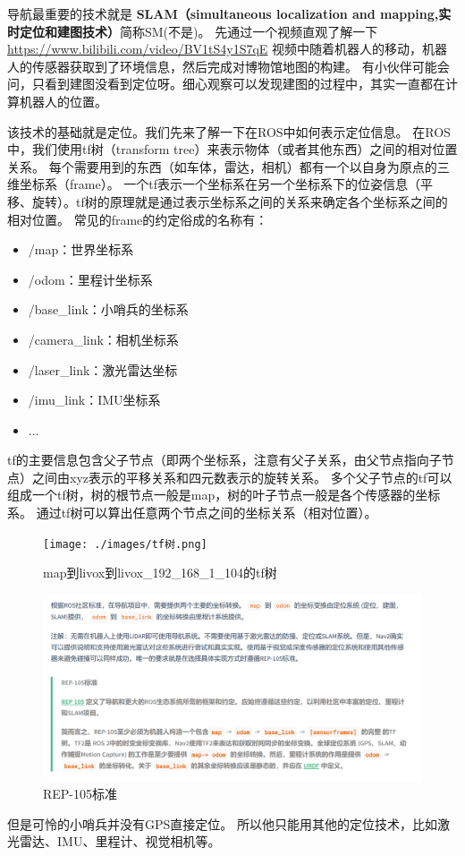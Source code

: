 导航最重要的技术就是
\textbf{SLAM（simultaneous localization and mapping,实时定位和建图技术）}简称SM(不是)。
先通过一个视频直观了解一下\url{https://www.bilibili.com/video/BV1tS4y1S7qE}
视频中随着机器人的移动，机器人的传感器获取到了环境信息，然后完成对博物馆地图的构建。
有小伙伴可能会问，只看到建图没看到定位呀。细心观察可以发现建图的过程中，其实一直都在计算机器人的位置。

该技术的基础就是定位。我们先来了解一下在ROS中如何表示定位信息。
在ROS中，我们使用tf树（transform tree）来表示物体（或者其他东西）之间的相对位置关系。
每个需要用到的东西（如车体，雷达，相机）都有一个以自身为原点的三维坐标系（frame）。
一个tf表示一个坐标系在另一个坐标系下的位姿信息（平移、旋转）。tf树的原理就是通过表示坐标系之间的关系来确定各个坐标系之间的相对位置。
常见的frame的约定俗成的名称有：
\begin{itemize}
\item /map：世界坐标系
\item /odom：里程计坐标系
\item /base\_link：小哨兵的坐标系
\item /camera\_link：相机坐标系
\item /laser\_link：激光雷达坐标
\item /imu\_link：IMU坐标系
\item ...
\end{itemize}

tf的主要信息包含父子节点（即两个坐标系，注意有父子关系，由父节点指向子节点）之间由xyz表示的平移关系和四元数表示的旋转关系。
多个父子节点的tf可以组成一个tf树，树的根节点一般是map，树的叶子节点一般是各个传感器的坐标系。
通过tf树可以算出任意两个节点之间的坐标关系（相对位置）。
\begin{figure}[H]
        \centering
        \texttt{[image: ./images/tf树.png]}
        \caption{map到livox到livox\_192\_168\_1\_104的tf树}
\end{figure}
\begin{figure}[H]
        \centering
        \includegraphics[width=1.0\textwidth]{./images/REP-105标准.png}
        \caption{REP-105标准}
\end{figure}
但是可怜的小哨兵并没有GPS直接定位。
所以他只能用其他的定位技术，比如激光雷达、IMU、里程计、视觉相机等。

